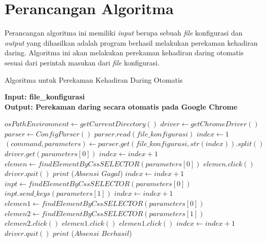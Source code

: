 \section{Perancangan Algoritma} 
Perancangan algoritma ini memiliki \textit{input} berupa sebuah \textit{file} konfigurasi dan \textit{output} yang dihasilkan adalah program berhasil melakukan perekaman kehadiran daring. Algoritma ini akan melakukan perekaman kehadiran daring otomatis sesuai dari perintah masukan dari \textit{file} konfigurasi. 
\begin{algorithm} 
	\caption{Algoritma untuk Perekaman Kehadiran Daring  Otomatis}\label{euclid} 
	\hspace*{\algorithmicindent} \textbf{Input: file\_konfigurasi}  \\
	\hspace*{\algorithmicindent} \textbf{Output: Perekaman daring secara otomatis pada Google Chrome} 
	\begin{algorithmic}[1]
	\State $osPathEnvironment \gets getCurrentDirectory()$
	\State $driver \gets getChromeDriver()$ 
	\State $parser \gets ConfigParser()$
	\State $parser.read(file\_konfigurasi)$
	\State $index \gets 1$
	\State $(command, parameters) \gets parser.get(file\_konfigurasi, str(index)).split()$
	\State $driver.get(parameters[0])$  
	\State $index \gets index + 1$
	\State $elemen \gets findElementByCssSELECTOR(parameters[0])$
	\State $elemen.click()$
	\Else 
	\State $driver.quit()$
	\State $print$ ($Absensi$ $Gagal$)
	\State $index \gets index + 1$
	\EndIf
	\State $inpt \gets findElementByCssSELECTOR(parameters[0])$
	\State $inpt.send\_keys(parameters[1])$
	\State $index \gets index + 1$
	\State $elemen1 \gets findElementByCssSELECTOR(parameters[0])$
	\State $elemen2 \gets findElementByCssSELECTOR(parameters[1])$
	\State $elemen2.click()$
	\State $elemen1.click()$
	\Else
	\State $elemen1.click()$
	\State $index \gets index + 1$
	\EndIf
	\State $driver.quit() $  
	\State $print$ ($Absensi$ $Berhasil$)
	\EndIf
	\EndWhile
	\end{algorithmic}
\end{algorithm}